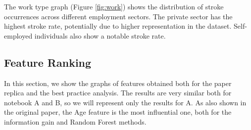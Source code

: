 \documentclass{Configuration_Files/Template}
\begin{document}
The work type graph (Figure \ref{fig:work}) shows the distribution of stroke occurrences across different employment sectors. The private sector has the highest stroke rate, potentially due to higher representation in the dataset. Self-employed individuals also show a notable stroke rate.

\subsection{Feature Ranking}

In this section, we show the graphs of features obtained both for the paper replica and the best practice analysis. The results are very similar both for notebook A and B, so we will represent only the results for A. As also shown in the original paper, the Age feature is the most influential one, both for the information gain and Random Forest methods.
\end{document}
